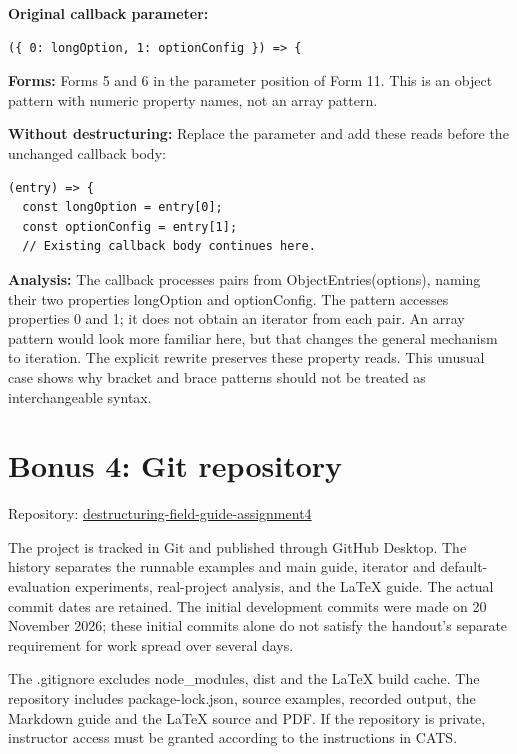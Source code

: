 \documentclass[10pt,a4paper]{article}
\begin{document}

\textbf{Original callback parameter:}

\begin{lstlisting}[language=GuideJS]
({ 0: longOption, 1: optionConfig }) => {
\end{lstlisting}

\textbf{Forms:} Forms 5 and 6 in the parameter position of Form 11. This is an object pattern with numeric property names, not an array pattern.


\textbf{Without destructuring:} Replace the parameter and add these reads before the unchanged callback body:

\begin{lstlisting}[language=GuideJS]
(entry) => {
  const longOption = entry[0];
  const optionConfig = entry[1];
  // Existing callback body continues here.
\end{lstlisting}

\textbf{Analysis:} The callback processes pairs from ObjectEntries(options), naming their two properties longOption and optionConfig. The pattern accesses properties 0 and 1; it does not obtain an iterator from each pair. An array pattern would look more familiar here, but that changes the general mechanism to iteration. The explicit rewrite preserves these property reads. This unusual case shows why bracket and brace patterns should not be treated as interchangeable syntax.

\section{Bonus 4: Git repository}

Repository: \href{https://github.com/mertsyh/destructuring-field-guide-assignment4}{destructuring-field-guide-assignment4}

The project is tracked in Git and published through GitHub Desktop. The history separates the runnable examples and main guide, iterator and default-evaluation experiments, real-project analysis, and the LaTeX guide. The actual commit dates are retained. The initial development commits were made on 20 November 2026; these initial commits alone do not satisfy the handout's separate requirement for work spread over several days.

The .gitignore excludes node\_modules, dist and the LaTeX build cache. The repository includes package-lock.json, source examples, recorded output, the Markdown guide and the LaTeX source and PDF. If the repository is private, instructor access must be granted according to the instructions in CATS.
\end{document}

